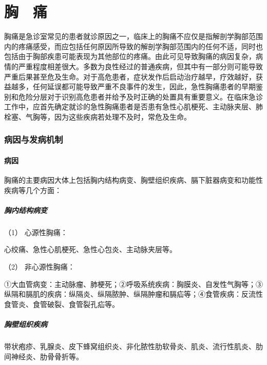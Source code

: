 \protect\hypertarget{text00022.html}{}{}

\chapter{胸　痛}

胸痛是急诊室常见的患者就诊原因之一，临床上的胸痛不应仅是指解剖学胸部范围内的疼痛感受，而应包括任何原因所导致的解剖学胸部范围内的任何不适，同时也包括由于胸部疾患可能表现为其他部位的疼痛。由此可见导致胸痛的病因复杂，病情的严重程度相差很大。多数为良性经过的普通疾病，但其中有一部分则可能导致严重后果甚至危及生命。对于高危患者，症状发作后启动治疗越早，疗效越好，获益越多，任何延误都可能导致严重不良事件的发生，因此，急性胸痛患者的早期鉴别和危险分层对于识别高危患者并给予及时正确的处置具有重要意义。在临床急诊工作中，应首先确定就诊的急性胸痛患者是否患有急性心肌梗死、主动脉夹层、肺栓塞、气胸等，因为这些疾病若处理不及时，常危及生命。

\subsection{病因与发病机制}

\subsubsection{病因}

胸痛的主要病因大体上包括胸内结构病变、胸壁组织疾病、膈下脏器病变和功能性疾病等几个方面：

\paragraph{胸内结构病变}

\hypertarget{text00022.htmlux5cux23CHP1-8-1-1-1-1}{}
（1） 心源性胸痛：

心绞痛、急性心肌梗死、急性心包炎、主动脉夹层等。

\hypertarget{text00022.htmlux5cux23CHP1-8-1-1-1-2}{}
（2） 非心源性胸痛：

①大血管病变：主动脉瘤、肺梗死；②呼吸系统疾病：胸膜炎、自发性气胸等；③纵隔和膈肌的疾病：纵隔炎、纵隔脓肿、纵隔肿瘤和膈疝等；④食管疾病：反流性食管炎、食管破裂、食管裂孔疝等。

\paragraph{胸壁组织疾病}

带状疱疹、乳腺炎、皮下蜂窝组织炎、非化脓性肋软骨炎、肌炎、流行性肌炎、肋间神经炎、肋骨骨折等。

